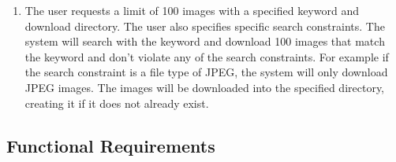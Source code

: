 \documentclass[12pt, titlepage]{article}
\begin{document}
\begin{enumerate}[label=Scenario \arabic*:, wide=0pt, leftmargin=*]
    \item The user requests a limit of 100 images with a specified keyword and download directory. The user also specifies specific search constraints. The system will search with the keyword and download 100 images that match the keyword and don't violate any of the search constraints. For example if the search constraint is a file type of JPEG, the system will only download JPEG images. The images will be downloaded into the specified directory, creating it if it does not already exist.
    
\end{enumerate}

\subsection{Functional Requirements}
\end{document}
